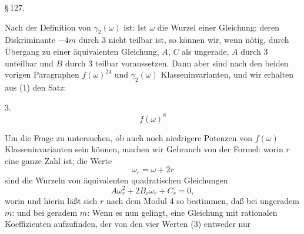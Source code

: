 

\S\,127. \textbf{}

Nach der Definition von $\gamma_2(\omega)$ ist:
Ist $\omega$ die Wurzel einer Gleichung:
deren Diskriminante $-4m$ durch 3 nicht teilbar ist, so können wir, wenn nötig, durch Übergang zu einer äquivalenten Gleichung, $A$, $C$ als ungerade, $A$ durch 3 unteilbar und $B$ durch 3 teilbar voraussetzen. Dann aber sind nach den beiden vorigen Paragraphen $f(\omega)^{24}$ und $\gamma_2(\omega)$ Klasseninvarianten, und wir erhalten aus (1) den Satz:

3. 
\[
f(\omega)^8
\]

Um die Frage zu untersuchen, ob auch noch niedrigere Potenzen von $f(\omega)$ Klasseninvarianten sein können, machen wir Gebrauch von der Formel:
worin $r$ eine ganze Zahl ist; die Werte
\[
\omega_r=\omega+2r
\]
sind die Wurzeln von äquivalenten quadratischen Gleichungen
\[
A\omega_r^2+2B_r\omega_r+C_r=0,
\]
worin
und hierin läßt sich $r$ nach dem Modul 4 so bestimmen, daß bei ungeradem $m$:
und bei geradem $m$:
Wenn es nun gelingt, eine Gleichung mit rationalen Koeffizienten aufzufinden, der von den vier Werten (3) entweder nur

